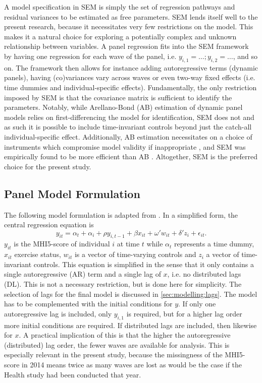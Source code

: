 A model specification in SEM is simply the set of regression pathways and residual variances to be estimated as free
parameters.
SEM lends itself well to the present research, because it necessitates very few restrictions on the model.
This makes it a natural choice for exploring a potentially complex and unknown relationship between variables.
A panel regression fits into the SEM framework by having one regression for each wave of the panel,
i.e. $y_{i,1} = \ldots; y_{i, 2} = \ldots$, and so on. The framework then allows for instance adding autoregressive terms
(dynamic panels), having (co)variances vary across waves or even two-way fixed effects
(i.e. time dummies and individual-specific effects).
Fundamentally, the only restriction imposed by SEM is that the covariance matrix is sufficient to identify the parameters.
Notably, while Arellano-Bond (AB) estimation of dynamic panel models relies on first-differencing the model for identification,
SEM does not and as such it is possible to include time-invariant controls beyond just the catch-all individual-specific effect.
Additionally, AB estimation necessitates on a choice of instruments which compromise model validity if inappropriate
\cite{bazzi2013blunt}, and SEM was empirically found to be more efficient than AB \cite{leszczensky2022deal}.
Altogether, SEM is the preferred choice for the present study.

\subsection{Panel Model Formulation}
\label{sec:methods:model_formulation}
The following model formulation is adapted from .
In a simplified form, the central regression equation is
\begin{equation}
    \label{eq:methods:model_formulation}
    y_{it} = \alpha_t + \alpha_i + \rho y_{i,t-1} + \beta x_{it} + \omega' w_{it} + \delta' z_i + \epsilon_{it}.
\end{equation}
$y_{it}$ is the MHI5-score of individual $i$ at time $t$ while $\alpha_t$ represents a time dummy,
$x_{it}$ exercise status, $w_{it}$ is a vector of time-varying controls and $z_i$ a vector of time-invariant controls.
This equation is simplified in the sense that it only contains a single autoregressive (AR) term and a single lag of $x$,
i.e. no distributed lags (DL). This is not a necessary restriction, but is done here for simplicity.
The selection of lags for the final model is discussed in \cref{sec:modelling:lags}. The model has to be complemented
with the initial conditions for $y$. If only one autoregressive lag is included, only $y_{i,1}$ is required,
but for a higher lag order more initial conditions are required. If distributed lags are included, then likewise for $x$.
A practical implication of this is that the higher the autoregressive (distributed) lag order, the fewer waves
are available for analysis. This is especially relevant in the present study, because the missingness of the MHI5-score
in 2014 means twice as many waves are lost as would be the case if the Health study had been conducted that year.


